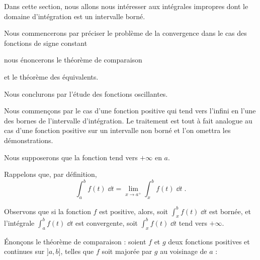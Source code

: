







\debuttexte


\diapo

Dans cette section, nous allons nous intéresser aux intégrales 
impropres dont le domaine d'intégration est un intervalle borné.

  \change

  \change

Nous commencerons par préciser le problème de la 
convergence dans le cas des fonctions de signe constant

  \change

nous énoncerons le théorème de comparaison
 
\change

et le théorème des équivalents.

\change
 
Nous conclurons par l'étude des fonctions oscillantes.

 
 \diapo

Nous commençons par le cas d'une fonction positive qui tend vers
l'infini en l'une des bornes de l'intervalle d'intégration. 
Le traitement est tout à fait analogue au cas d'une fonction positive 
sur un intervalle non borné et l'on omettra les démonstrations.

Nous supposerons que la fonction  tend vers $+\infty$ en $a$.  

\change

Rappelons que, par définition,
$$\int_a^b f(t)\;\dd t = \lim_{x\rightarrow a^+} \int_x^b f(t)\;\dd t\;.$$

Observons que si la fonction $f$ est positive, alors,
soit $\int_x^b f(t)\;\dd t$ est bornée, et l'intégrale $\int_a^b
f(t)\;\dd t$ est convergente, soit $\int_x^b f(t)\;\dd t$ tend vers
$+\infty$.


\diapo

Énonçons le théorème de comparaison : soient $f$ et $g$ 
deux fonctions positives et continues sur $]a,b]$, 
telles que $f$ soit majorée par $g$ au 
voisinage de $a$ :

